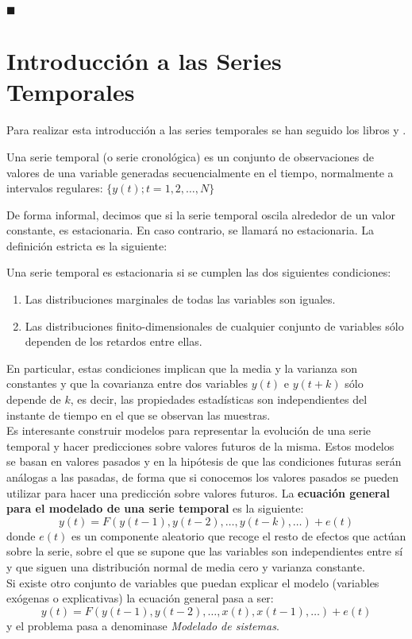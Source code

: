 \begin{flushright}
$\blacksquare$
\end{flushright}

\section{Introducción a las Series Temporales}

Para realizar esta introducción a las series temporales se han seguido los libros \cite{pena05} y \cite{box08}.\\

\begin{definicion}
Una serie temporal (o serie cronológica) es un conjunto de observaciones de valores de una variable generadas secuencialmente en el tiempo, normalmente a intervalos regulares: $\{y(t); t=1,2,\dots, N\}$
\end{definicion}

De forma informal, decimos que si la serie temporal oscila alrededor de un valor constante, es estacionaria. En caso contrario, se llamará no estacionaria. La definición estricta es la siguiente:
\begin{definicion}
Una serie temporal es estacionaria si se cumplen las dos siguientes condiciones:
\begin{enumerate}
\item Las distribuciones marginales de todas las variables son iguales.
\item Las distribuciones finito-dimensionales de cualquier conjunto de variables sólo dependen de los retardos entre ellas.
\end{enumerate}
\end{definicion}
En particular, estas condiciones implican que la media y la varianza son constantes y que la covarianza entre dos variables $y(t)$ e $y(t+k)$ sólo depende de $k$, es decir, las propiedades estadísticas son independientes del instante de tiempo en el que se observan las muestras.\\


Es interesante construir modelos para representar la evolución de una serie temporal y hacer predicciones sobre valores futuros de la misma. Estos modelos se basan en valores pasados y en la hipótesis de que las condiciones futuras serán análogas a las pasadas, de forma que si conocemos los valores pasados se pueden utilizar para hacer una predicción sobre valores futuros. La \textbf{ecuación general para el modelado de una serie temporal} es la siguiente:
\[	y(t) = F(y(t-1), y(t-2), \dots, y(t-k), \dots) + e(t)	\]
donde $e(t)$ es un componente aleatorio que recoge el resto de efectos que actúan sobre la serie, sobre el que se supone que las variables son independientes entre sí y que siguen una distribución normal de media cero y varianza constante.\\
Si existe otro conjunto de variables que puedan explicar el modelo (variables exógenas o explicativas) la ecuación general pasa a ser:
\[	y(t) = F(y(t-1), y(t-2), \dots, x(t), x(t-1), \dots) + e(t)	\]
y el problema pasa a denominase \textit{Modelado de sistemas}.\\

